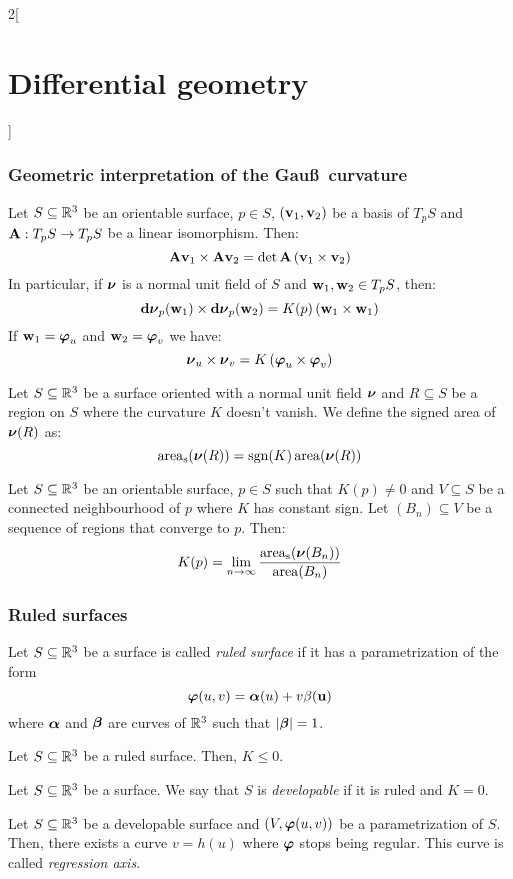 \documentclass[../../../main.tex]{subfiles}
\begin{document}
\begin{multicols}{2}[\section{Differential geometry}]
  \subsubsection{Geometric interpretation of the Gau\ss\ curvature}
  \begin{lemma}
    Let $S\subseteq\mathbb{R}^3$ be an orientable surface, $p\in S$, $(\boldsymbol{\mathrm{v}}_1,\boldsymbol{\mathrm{v}}_2)$ be a basis of $T_pS$ and $\boldsymbol{\mathrm{A}}:T_pS\rightarrow T_pS$ be a linear isomorphism. Then: $$\boldsymbol{\mathrm{A}}\boldsymbol{\mathrm{v}}_1\times\boldsymbol{\mathrm{A}}\boldsymbol{\mathrm{v}}_2=\det\boldsymbol{\mathrm{A}}\left(\boldsymbol{\mathrm{v}}_1\times\boldsymbol{\mathrm{v}}_2\right)$$
    In particular, if $\boldsymbol{\mathrm{\nu}}$ is a normal unit field of $S$ and $\boldsymbol{\mathrm{w}}_1,\boldsymbol{\mathrm{w}}_2\in T_pS$, then: $$\boldsymbol{\mathrm{\dd{\nu}}}_p(\boldsymbol{\mathrm{w}}_1)\times\boldsymbol{\mathrm{\dd{\nu}}}_p(\boldsymbol{\mathrm{w}}_2)=K(p)\left(\boldsymbol{\mathrm{w}}_1\times\boldsymbol{\mathrm{w}}_1\right)$$
    If $\boldsymbol{\mathrm{w}}_1=\boldsymbol{\mathrm{\varphi}}_u$ and $\boldsymbol{\mathrm{w}}_2=\boldsymbol{\mathrm{\varphi}}_v$ we have: $$\boldsymbol{\mathrm{\nu}}_u\times\boldsymbol{\mathrm{\nu}}_v=K\left(\boldsymbol{\mathrm{\varphi}}_u\times\boldsymbol{\mathrm{\varphi}}_v\right)$$
  \end{lemma}
  \begin{definition}
    Let $S\subseteq\mathbb{R}^3$ be a surface oriented with a normal unit field $\boldsymbol{\mathrm{\nu}}$ and $R\subseteq S$ be a region on $S$ where the curvature $K$ doesn't vanish. We define the signed area of $\boldsymbol{\mathrm{\nu}}(R)$ as: $$\operatorname{area}_\text{s}(\boldsymbol{\mathrm{\nu}}(R))=\operatorname{sgn}(K)\operatorname{area}(\boldsymbol{\mathrm{\nu}}(R))$$
  \end{definition}
  \begin{proposition}
    Let $S\subseteq\mathbb{R}^3$ be an orientable surface, $p\in S$ such that $K(p)\ne 0$ and $V\subseteq S$ be a connected neighbourhood of $p$ where $K$ has constant sign. Let $(B_n)\subseteq V$ be a sequence of regions that converge to $p$. Then: $$K(p)=\lim_{n\to\infty}\frac{\operatorname{area}_\text{s}(\boldsymbol{\mathrm{\nu}}(B_n))}{\operatorname{area}(B_n)}$$
  \end{proposition}
  \subsubsection{Ruled surfaces}
  \begin{definition}
    Let $S\subseteq\mathbb{R}^3$ be a surface is called \emph{ruled surface} if it has a parametrization of the form $$\boldsymbol{\mathrm{\varphi}}(u,v)=\boldsymbol{\mathrm{\alpha}}(u)+v\bf\beta(u)$$ where $\boldsymbol{\mathrm{\alpha}}$ and $\boldsymbol{\mathrm{\beta}}$ are curves of $\mathbb{R}^3$ such that $\abs{\boldsymbol{\mathrm{\beta}}}=1$.
  \end{definition}
  \begin{proposition}
    Let $S\subseteq\mathbb{R}^3$ be a ruled surface. Then, $K\leq 0$.
  \end{proposition}
  \begin{definition}
    Let $S\subseteq\mathbb{R}^3$ be a surface. We say that $S$ is \emph{developable} if it is ruled and $K=0$.
  \end{definition}
  \begin{proposition}
    Let $S\subseteq\mathbb{R}^3$ be a developable surface and $(V,\boldsymbol{\mathrm{\varphi}}(u,v))$ be a parametrization of $S$. Then, there exists a curve $v=h(u)$ where $\boldsymbol{\mathrm{\varphi}}$ stops being regular. This curve is called \emph{regression axis}.
  \end{proposition}

\end{multicols}
\end{document}

